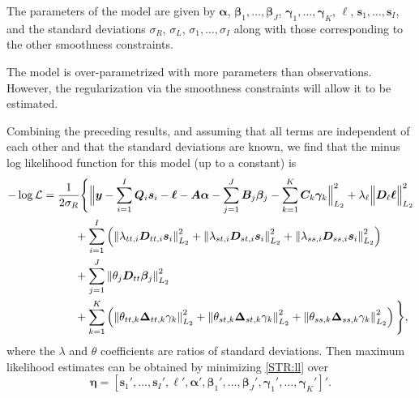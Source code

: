 \documentclass[11pt,a4paper,]{article}
\begin{document}
\label{sec:STR_solution}

The parameters of the model are given by \(\bm{\alpha}\), \(\bm{\beta}_1,\dots,\bm{\beta}_J\), \(\bm{\gamma}_1,\dots,\bm{\gamma}_K\), \(\bm{\ell}\), \(\bm{s}_1,\dots,\bm{s}_I\), and the standard deviations \(\sigma_R\), \(\sigma_L\), \(\sigma_1,\dots,\sigma_I\) along with those corresponding to the other smoothness constraints.

The model is over-parametrized with more parameters than observations. However, the regularization via the smoothness constraints will allow it to be estimated.

Combining the preceding results, and assuming that all terms are independent of each other and that the standard deviations are known, we find that the minus log likelihood function for this model (up to a constant) is
\begin{align}
  -\log \mathcal{L} &=
  \frac{1}{2\sigma_R}
  \Bigg\{
    \Big\|\bm{y}- \sum_{i=1}^I \bm{Q}_i\bm{s}_i - \bm{\ell} -
    \bm{A}\bm{\alpha} -
    \sum_{j=1}^{J} \bm{B}_j \bm{\beta}_j -
    \sum_{k=1}^{K} \bm{C}_k \bm{\gamma}_{k}
     \Big\|_{L_2}^2
    + \lambda_\ell\Big\|\bm{D}_\ell \bm{\ell}\Big\|_{L_2}^2\nonumber\\
  & \hspace*{1cm}\mbox{} + \sum_{i=1}^{I}\left(
                  \left\|\lambda_{tt,i} \bm{D}_{tt,i} \bm{s}_i \right\|_{L_2}^2 +
                  \left\|\lambda_{st,i} \bm{D}_{st,i} \bm{s}_i \right\|_{L_2}^2 +
                  \left\|\lambda_{ss,i} \bm{D}_{ss,i} \bm{s}_i \right\|_{L_2}^2 \right)
    \nonumber\\
  & \hspace*{1cm}\mbox{} +
           \sum_{j=1}^{J}\left\|\theta_j \bm{D}_{tt} \bm{\beta}_j\right\|_{L_2}^2
    \nonumber\\
  &  \hspace*{1cm}\mbox{}+ \sum_{k=1}^{K}\left(
      \left\|\theta_{tt,k} \bm{\Delta}_{tt,k} \gamma_k\right\|_{L_2}^2
    + \left\|\theta_{st,k} \bm{\Delta}_{st,k} \gamma_k\right\|_{L_2}^2
    + \left\|\theta_{ss,k} \bm{\Delta}_{ss,k} \gamma_k\right\|_{L_2}^2
    \right)
  \Bigg\},
  \label{STR:ll}
\end{align}
where the \(\lambda\) and \(\theta\) coefficients are ratios of standard deviations. Then maximum likelihood estimates can be obtained by minimizing \eqref{STR:ll} over
\begin{equation}\label{regr:beta}
  \bm{\eta} = [\bm{s}_1', \dots, \bm{s}_I', \bm{\ell}', \bm{\alpha}', \bm{\beta}_1', \dots , \bm{\beta}_J', \bm{\gamma}_1', \dots , \bm{\gamma}_K']'.
\end{equation}
\end{document}
